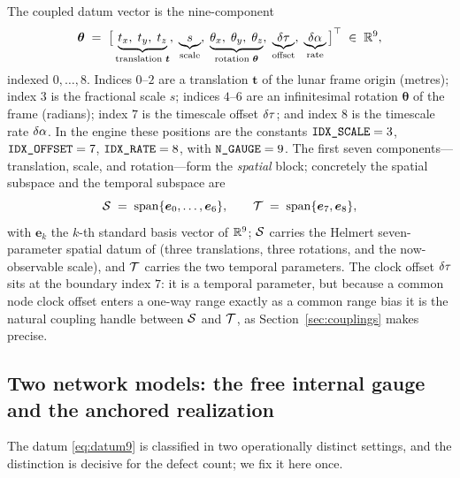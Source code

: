 The coupled datum vector is the nine-component
\begin{equation}
  \bm{\theta}
  \;=\;
  \bigl[\,\underbrace{t_x,\;t_y,\;t_z}_{\text{translation }\bm t},\;
         \underbrace{s}_{\text{scale}},\;
         \underbrace{\theta_x,\;\theta_y,\;\theta_z}_{\text{rotation }\bm\theta},\;
         \underbrace{\delta\tau}_{\text{offset}},\;
         \underbrace{\delta\alpha}_{\text{rate}}\,\bigr]^\top
  \;\in\;\mathbb{R}^{9},
  \label{eq:datum9}
\end{equation}
indexed $0,\dots,8$. Indices $0$--$2$ are a translation $\bm t$ of the lunar frame origin
(metres); index $3$ is the fractional scale $s$; indices $4$--$6$ are an infinitesimal
rotation $\bm\theta$ of the frame (radians); index $7$ is the timescale offset $\delta\tau$;
and index $8$ is the timescale rate $\delta\alpha$. In the engine these positions are the
constants $\texttt{IDX\_SCALE}=3$, $\texttt{IDX\_OFFSET}=7$, $\texttt{IDX\_RATE}=8$, with
$\texttt{N\_GAUGE}=9$. The first seven components---translation, scale, and rotation---form
the \emph{spatial} block; concretely the spatial subspace and the temporal subspace are
\begin{equation}
  \mathcal{S} \;=\; \operatorname{span}\{\bm e_0,\dots,\bm e_6\},
  \qquad
  \mathcal{T} \;=\; \operatorname{span}\{\bm e_7,\bm e_8\},
  \label{eq:subspaces}
\end{equation}
with $\bm e_k$ the $k$-th standard basis vector of $\mathbb{R}^{9}$; $\mathcal{S}$ carries the Helmert
seven-parameter spatial datum of \citep{baweja2026datum} (three translations, three
rotations, and the now-observable scale), and $\mathcal{T}$ carries the two temporal parameters.
The clock offset $\delta\tau$ sits at the boundary index $7$: it is a temporal parameter, but
because a common node clock offset enters a one-way range exactly as a common range bias
it is the natural coupling handle between $\mathcal{S}$ and $\mathcal{T}$, as Section~\ref{sec:couplings}
makes precise.

\subsection{Two network models: the free internal gauge and the anchored realization}
\label{sec:models}

The datum \eqref{eq:datum9} is classified in two operationally distinct settings, and the
distinction is decisive for the defect count; we fix it here once.

